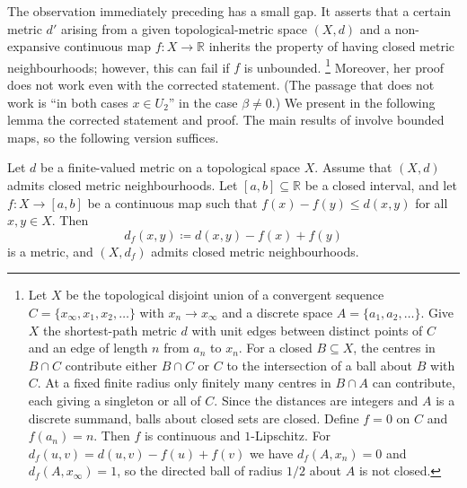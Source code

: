 \documentclass[11pt]{amsart}
\theoremstyle{definition}
\newcommand{\R}{\mathbb{R}}
\begin{document}
The observation immediately preceding \cite[Lemma~2.1]{Mat00} has a small gap. It asserts that a certain metric $d'$ arising from a given topological-metric space $(X,d)$ and a non-expansive continuous map $f \colon X \to \R$ inherits the property of having closed metric neighbourhoods; however, this can fail if $f$ is unbounded.%
\footnote{Let $X$ be the topological disjoint union of a convergent sequence $C=\{x_\infty,x_1,x_2,\ldots\}$ with $x_n\to x_\infty$ and a discrete space $A=\{a_1,a_2,\ldots\}$. Give $X$ the shortest-path metric $d$ with unit edges between distinct points of $C$ and an edge of length $n$ from $a_n$ to $x_n$. For a closed $B\subseteq X$, the centres in $B\cap C$ contribute either $B\cap C$ or $C$ to the intersection of a ball about $B$ with $C$. At a fixed finite radius only finitely many centres in $B\cap A$ can contribute, each giving a singleton or all of $C$. Since the distances are integers and $A$ is a discrete summand, balls about closed sets are closed. Define $f=0$ on $C$ and $f(a_n)=n$. Then $f$ is continuous and $1$-Lipschitz. For $d_f(u,v)=d(u,v)-f(u)+f(v)$ we have $d_f(A,x_n)=0$ and $d_f(A,x_\infty)=1$, so the directed ball of radius $1/2$ about $A$ is not closed.}
Moreover, her proof does not work even with the corrected statement. (The passage that does not work is ``in both cases $x \in U_2$'' in the case $\beta \neq 0$.)
We present in the following lemma the corrected statement and proof.
The main results of \cite{Mat00} involve bounded maps, so the following version suffices.

\begin{lemma}\label{d:lem:1}
  Let $d$ be a finite-valued metric on a topological space $X$. Assume that $(X,d)$ admits closed metric neighbourhoods. Let $[a,b] \subseteq \R$ be a closed interval, and let $f\colon X\to[a,b]$ be a continuous map such that $f(x)-f(y)\leq d(x,y)$ for all $x,y\in X$. Then
  \[
    d_f(x,y)\coloneqq d(x,y)-f(x)+f(y)
  \]
  is a metric, and $(X,d_f)$ admits closed metric neighbourhoods.
\end{lemma}
\end{document}
